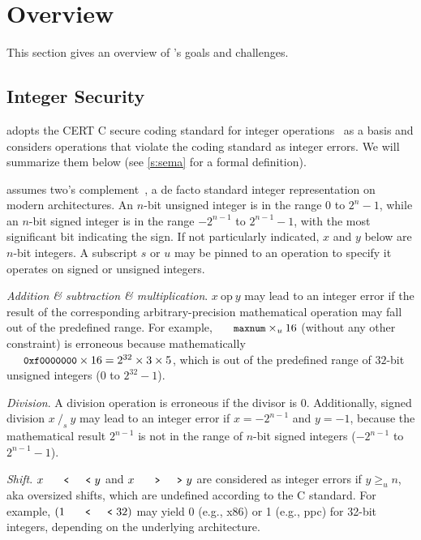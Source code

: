 \section{Overview}
\label{s:oview}

This section gives an overview of \sys's goals and challenges.

\subsection{Integer Security}
\label{s:goal}

\sys adopts the CERT C secure coding standard for integer
operations~\cite[\chapterautorefname~5]{seacord:secure-c} as a basis
and considers operations that violate the coding standard as integer
errors.  We will summarize them below (see \autoref{s:sema} for a
formal definition).

\sys assumes two's complement~\cite[\chapterautorefname~4.2.1]{intel:vol1},
a de facto standard integer representation on modern architectures.
An $n$-bit unsigned integer is in the range $0$ to $2^n-1$, while
an $n$-bit signed integer is in the range $-2^{n-1}$ to $2^{n-1}-1$,
with the most significant bit indicating the sign.  If not particularly
indicated, $x$ and $y$ below are $n$-bit integers.  A subscript $s$
or $u$ may be pinned to an operation to specify it operates on
signed or unsigned integers.

\noindent
{\it Addition \& subtraction \& multiplication}.
$x\ \textrm{op}\ y$ may lead to an integer error if the result of
the corresponding arbitrary-precision mathematical operation may
fall out of the predefined range.  For example, $\cc{maxnum}\times_u
16$ (without any other constraint) is erroneous because mathematically
$\cc{0xf0000000} \times 16 = 2^{32}\times 3\times 5$, which is out
of the predefined range of $32$-bit unsigned integers ($0$ to $2^{32}
- 1$).

\noindent
{\it Division}.
A division operation is erroneous if the divisor is 0.  Additionally,
signed division $x\ /_s\ y$ may lead to an integer error if $x =
-2^{n-1}$ and $y = -1$, because the mathematical result $2^{n-1}$
is not in the range of $n$-bit signed integers ($-2^{n-1}$ to
$2^{n-1}-1$).

\noindent
{\it Shift}. $x \shl y$ and $x \shr y$ are considered as integer
errors if $y \geq_u n$, aka oversized shifts, which are undefined
according to the C standard.  For example, $(1 \shl 32)$ may yield
0 (e.g., x86) or 1 (e.g., ppc) for 32-bit integers, depending on
the underlying architecture.


